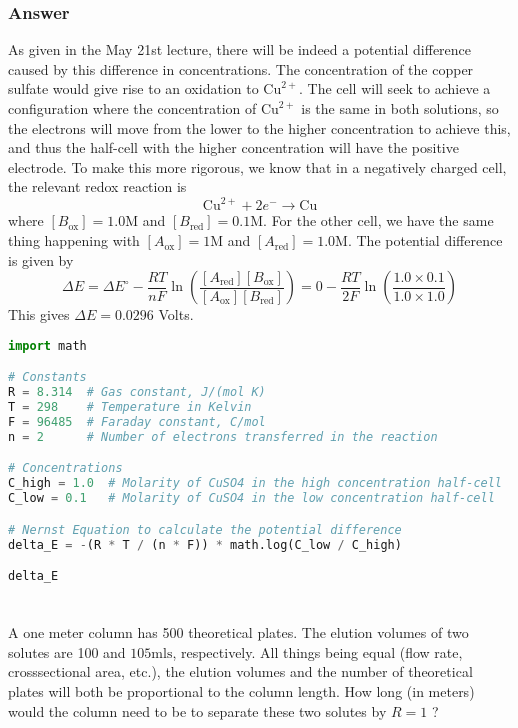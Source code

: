 \documentclass[12pt]{article}
\begin{document}
\subsubsection{Answer}
As given in the May 21st lecture, there will be indeed a potential difference caused by this difference in concentrations. The concentration of the copper sulfate would give rise to an oxidation to $\mathrm{Cu}^{2+}$. The cell will seek to achieve a configuration where the concentration of $\mathrm{Cu}^{2+}$ is the same in both solutions, so the electrons will move from the lower to the higher concentration to achieve this, and thus the half-cell with the higher concentration will have the positive electrode. To make this more rigorous, we know that in a negatively charged cell, the relevant redox reaction is
\begin{equation}
  \mathrm{Cu}^{2+}+2e^{-} \rightarrow \mathrm{Cu}
\end{equation}
where $[B_{\text{ox}}] = 1.0 \mathrm{M}$ and $[B_{\text{red}}] = 0.1 \mathrm{M}$. For the other cell, we have the same thing happening with $[A_{\text{ox}}] = 1 \mathrm{M}$ and $[A_{\text{red}}] = 1.0 \mathrm{M}$. The potential difference is given by
\begin{equation}
  \Delta E= \Delta E ^{\circ} - \frac{RT}{nF} \ln \left(\frac{[A_{\text{red}}][B_{\text{ox}}]}{[A_{\text{ox}}][B_{\text{red}}]}\right) = 0 - \frac{RT}{2F} \ln \left(\frac{1.0 \times 0.1}{1.0 \times 1.0}\right)
\end{equation}
This gives $\Delta E = 0.0296$ Volts.
\begin{lstlisting}[language=Python]
import math

# Constants
R = 8.314  # Gas constant, J/(mol K)
T = 298    # Temperature in Kelvin
F = 96485  # Faraday constant, C/mol
n = 2      # Number of electrons transferred in the reaction

# Concentrations
C_high = 1.0  # Molarity of CuSO4 in the high concentration half-cell
C_low = 0.1   # Molarity of CuSO4 in the low concentration half-cell

# Nernst Equation to calculate the potential difference
delta_E = -(R * T / (n * F)) * math.log(C_low / C_high)

delta_E


\end{lstlisting}


\section{}
A one meter column has 500 theoretical plates. The elution volumes of two solutes are 100 and $105 \mathrm{mls}$, respectively. All things being equal (flow rate, crosssectional area, etc.), the elution volumes and the number of theoretical plates will both be proportional to the column length. How long (in meters) would the column need to be to separate these two solutes by $R=1$ ?
\end{document}

